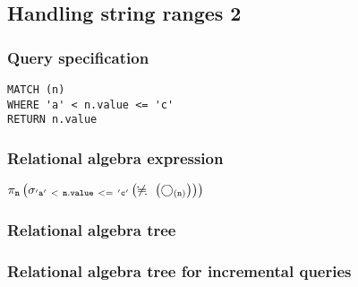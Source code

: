\subsection{Handling string ranges 2}

\subsubsection*{Query specification}

\begin{lstlisting}
MATCH (n)
WHERE 'a' < n.value <= 'c'
RETURN n.value
\end{lstlisting}

\subsubsection*{Relational algebra expression}

$\projection{\var{n}} \left(\selection{\mathtt{'a'~<~n.value~<=~'c'}} \left(\alldifferent{} \left(\getvertices{n}{}\right)\right)\right)$

\subsubsection*{Relational algebra tree}


\subsubsection*{Relational algebra tree for incremental queries}


